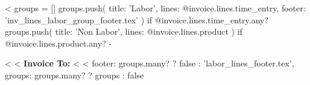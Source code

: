 <%
groups = []
groups.push(
  { title: 'Labor', lines: @invoice.lines.time_entry,
    footer: 'inv_lines_labor_group_footer.tex' }
) if @invoice.lines.time_entry.any?
groups.push(
  { title: 'Non Labor', lines: @invoice.lines.product }
) if @invoice.lines.product.any?
-%
\setlength{\LTpre}{0pt}

<%
<%
\textbf{Invoice To:}
\medskip
\hspace*{3ex}{
  <%
}
\medskip
<%
<%
    footer: groups.many? ? false : 'labor_lines_footer.tex',
    groups: groups.many? ? groups : false %

